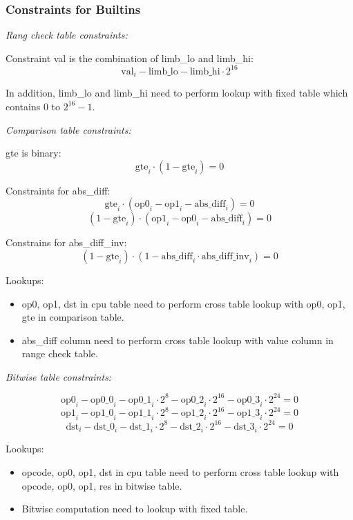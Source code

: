 \subsubsection{Constraints for Builtins} \label{sec:builtins-constraints}

\emph{Rang check table constraints:}

Constraint val is the combination of limb\_lo and limb\_hi:
\[ \mathrm{val}_i - \mathrm{limb\_lo} - \mathrm{limb\_hi} \cdot 2^{16} \]

In addition, limb\_lo and limb\_hi need to perform lookup with fixed table which contains 0 to $2^{16}-1$.

\emph{Comparison table constraints:}

gte is binary:
\[ \mathrm{gte}_i \cdot (1 - \mathrm{gte}_i) = 0 \]

Constraints for abs\_diff:
\[ \mathrm{gte}_i \cdot (\mathrm{op0}_i-\mathrm{op1}_i-\mathrm{abs\_diff}_i)=0 \]
\[ (1-\mathrm{gte}_i) \cdot (\mathrm{op1}_i-\mathrm{op0}_i-\mathrm{abs\_diff}_i)=0 \]

Constrains for abs\_diff\_inv:
\[ (1-\mathrm{gte}_i) \cdot (1-\mathrm{abs\_diff}_i \cdot \mathrm{abs\_diff\_inv}_i)=0 \]

Lookups:
\begin{itemize}
    \item op0, op1, dst in cpu table need to perform cross table lookup with op0, op1, gte in comparison table.
    \item abs\_diff column need to perform cross table lookup with value column in range check table.
\end{itemize}

\emph{Bitwise table constraints:}

\[ \mathrm{op0}_i - \mathrm{op0\_0}_i - \mathrm{op0\_1}_i \cdot 2^{8} - \mathrm{op0\_2}_i \cdot 2^{16}- \mathrm{op0\_3}_i \cdot 2^{24} = 0 \]
\[ \mathrm{op1}_i - \mathrm{op1\_0}_i - \mathrm{op1\_1}_i \cdot 2^{8} - \mathrm{op1\_2}_i \cdot 2^{16}- \mathrm{op1\_3}_i \cdot 2^{24} = 0 \]
\[ \mathrm{dst}_i - \mathrm{dst\_0}_i - \mathrm{dst\_1}_i \cdot 2^{8} - \mathrm{dst\_2}_i \cdot 2^{16}- \mathrm{dst\_3}_i \cdot 2^{24} = 0 \]

Lookups:
\begin{itemize}
    \item opcode, op0, op1, dst in cpu table need to perform cross table lookup with opcode, op0, op1, res in bitwise table.
    \item Bitwise computation need to lookup with fixed table.
\end{itemize}

